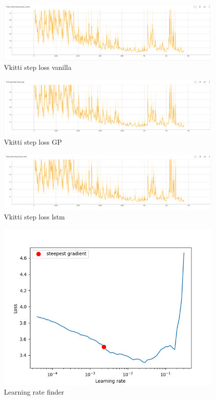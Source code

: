 	\begin{figure}
		\centering
		\includegraphics[width=13cm]{images/vanilla_step_loss_vkitti.png}
		\caption{Vkitti step loss vanilla}
		\label{fig:android_result}
	\end{figure}

	\begin{figure}
		\centering
		\includegraphics[width=13cm]{images/gp_step_loss_vkitti.png}
		\caption{Vkitti step loss GP}
		\label{fig:android_result}
	\end{figure}

	\begin{figure}
		\centering
		\includegraphics[width=13cm]{images/lstm_step_loss_vkitti.png}
		\caption{Vkitti step loss lstm}
		\label{fig:android_result}
	\end{figure}

	\begin{figure}
		\centering
		\includegraphics[width=13cm]{images/lr_finder_41.png}
		\caption{Learning rate finder}
		\label{fig:android_result}
	\end{figure}


